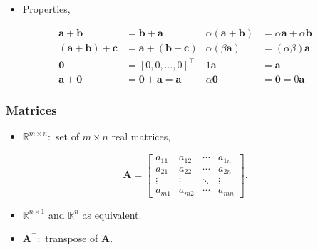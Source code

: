 \documentclass[12pt,thmsa]{article}
\begin{document}
\begin{itemize}
	\item Properties,
\end{itemize}

\begin{equation*}
	\begin{aligned}
		\boldsymbol{a}+\boldsymbol{b} & =\boldsymbol{b}+\boldsymbol{a} & \alpha(\boldsymbol{a}+\boldsymbol{b}) & =\alpha \boldsymbol{a}+\alpha \boldsymbol{b} \\
		(\boldsymbol{a}+\boldsymbol{b})+\boldsymbol{c} & =\boldsymbol{a}+(\boldsymbol{b}+\boldsymbol{c}) & \alpha(\beta \boldsymbol{a}) & =(\alpha \beta) \boldsymbol{a} \\
		\mathbf{0} & =[0,0, \ldots, 0]^{\top} & 1 \boldsymbol{a} & =\boldsymbol{a} \\
		\boldsymbol{a}+\mathbf{0} & =\mathbf{0}+\boldsymbol{a}=\boldsymbol{a} & \alpha \mathbf{0} & =\mathbf{0}=0 \boldsymbol{a}
	\end{aligned}
\end{equation*}

\subsubsection{Matrices}

\begin{itemize}
	\item \(\mathbb{R}^{m \times n}:\) set of \(m \times n\) real matrices,
\end{itemize}

\begin{equation*}
	\boldsymbol{A}=\left[\begin{array}{cccc}
		a_{11} & a_{12} & \cdots & a_{1 n} \\
		a_{21} & a_{22} & \cdots & a_{2 n} \\
		\vdots & \vdots & \ddots & \vdots \\
		a_{m 1} & a_{m 2} & \cdots & a_{m n}
	\end{array}\right].
\end{equation*}

\begin{itemize}
	\item \(\mathbb{R}^{n \times 1}\) and \(\mathbb{R}^{n}\) as equivalent.
	
	\item \(\boldsymbol{A}^{\top}:\) transpose of \(\boldsymbol{A}\).
	
\end{itemize}
\end{document}
